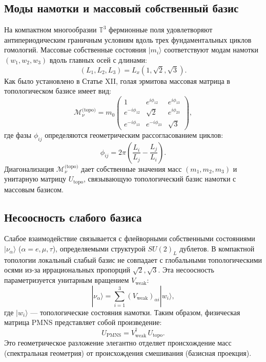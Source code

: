 \documentclass[12pt,a4paper]{article}
\begin{document}
\subsection{Моды намотки и массовый собственный базис}
На компактном многообразии $\mathbb{T}^3$ фермионные поля удовлетворяют антипериодическим граничным условиям вдоль трех фундаментальных циклов гомологий. Массовые собственные состояния $|m_i\rangle$ соответствуют модам намотки $(w_1, w_2, w_3)$ вдоль главных осей с длинами:
\begin{equation}
    (L_1, L_2, L_3) = L_x (1, \sqrt{2}, \sqrt{3}).
\end{equation}
Как было установлено в Статье XII, голая эрмитова массовая матрица в топологическом базисе имеет вид:
\begin{equation}
    \mathcal{M}_{\nu}^{\text{(topo)}} = m_0 \begin{pmatrix}
    1 & e^{i\phi_{12}} & e^{i\phi_{13}} \\
    e^{-i\phi_{12}} & \sqrt{2} & e^{i\phi_{23}} \\
    e^{-i\phi_{13}} & e^{-i\phi_{23}} & \sqrt{3}
    \end{pmatrix},
\end{equation}
где фазы $\phi_{ij}$ определяются геометрическим рассогласованием циклов:
\begin{equation}
    \phi_{ij} = 2\pi \left( \frac{L_i}{L_j} - \frac{L_j}{L_i} \right).
\end{equation}
Диагонализация $\mathcal{M}_{\nu}^{\text{(topo)}}$ дает собственные значения масс $(m_1, m_2, m_3)$ и унитарную матрицу $U_{\text{topo}}$, связывающую топологический базис намотки с массовым базисом.

\subsection{Несоосность слабого базиса}
Слабое взаимодействие связывается с флейворными собственными состояниями $|\nu_\alpha\rangle$ ($\alpha = e, \mu, \tau$), определяемыми структурой $SU(2)_L$ дублетов. В компактной топологии локальный слабый базис не совпадает с глобальными топологическими осями из-за иррациональных пропорций $\sqrt{2}, \sqrt{3}$. Эта несоосность параметризуется унитарным вращением $V_{\text{weak}}$:
\begin{equation}
    |\nu_\alpha\rangle = \sum_{i=1}^3 (V_{\text{weak}})_{\alpha i} |w_i\rangle,
\end{equation}
где $|w_i\rangle$ — топологические состояния намотки. Таким образом, физическая матрица PMNS представляет собой произведение:
\begin{equation}
    U_{\text{PMNS}} = V_{\text{weak}}^\dagger \, U_{\text{topo}}.
\end{equation}
Это геометрическое разложение элегантно отделяет происхождение масс (спектральная геометрия) от происхождения смешивания (базисная проекция).
\end{document}

